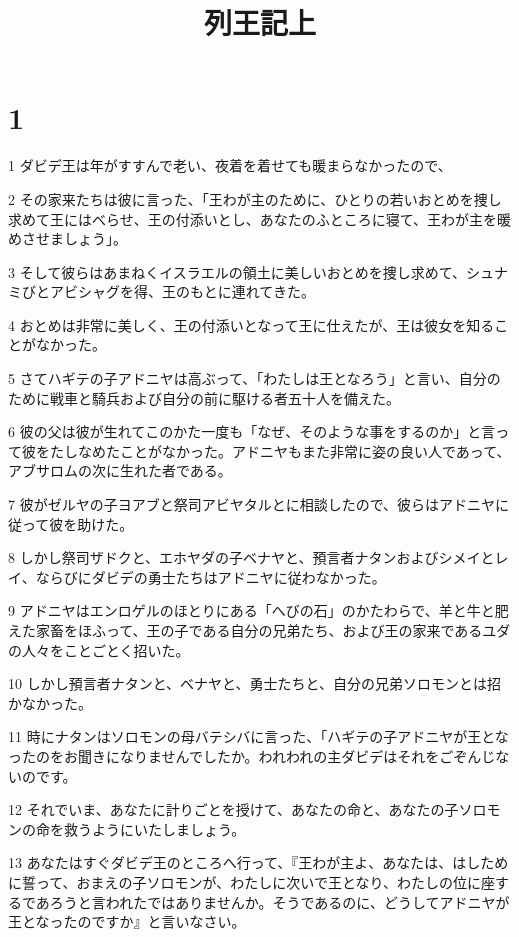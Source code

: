 

\title{列王記上}


\chapter{1}

\par 1 ダビデ王は年がすすんで老い、夜着を着せても暖まらなかったので、
\par 2 その家来たちは彼に言った、「王わが主のために、ひとりの若いおとめを捜し求めて王にはべらせ、王の付添いとし、あなたのふところに寝て、王わが主を暖めさせましょう」。
\par 3 そして彼らはあまねくイスラエルの領土に美しいおとめを捜し求めて、シュナミびとアビシャグを得、王のもとに連れてきた。
\par 4 おとめは非常に美しく、王の付添いとなって王に仕えたが、王は彼女を知ることがなかった。
\par 5 さてハギテの子アドニヤは高ぶって、「わたしは王となろう」と言い、自分のために戦車と騎兵および自分の前に駆ける者五十人を備えた。
\par 6 彼の父は彼が生れてこのかた一度も「なぜ、そのような事をするのか」と言って彼をたしなめたことがなかった。アドニヤもまた非常に姿の良い人であって、アブサロムの次に生れた者である。
\par 7 彼がゼルヤの子ヨアブと祭司アビヤタルとに相談したので、彼らはアドニヤに従って彼を助けた。
\par 8 しかし祭司ザドクと、エホヤダの子ベナヤと、預言者ナタンおよびシメイとレイ、ならびにダビデの勇士たちはアドニヤに従わなかった。
\par 9 アドニヤはエンロゲルのほとりにある「へびの石」のかたわらで、羊と牛と肥えた家畜をほふって、王の子である自分の兄弟たち、および王の家来であるユダの人々をことごとく招いた。
\par 10 しかし預言者ナタンと、ベナヤと、勇士たちと、自分の兄弟ソロモンとは招かなかった。
\par 11 時にナタンはソロモンの母バテシバに言った、「ハギテの子アドニヤが王となったのをお聞きになりませんでしたか。われわれの主ダビデはそれをごぞんじないのです。
\par 12 それでいま、あなたに計りごとを授けて、あなたの命と、あなたの子ソロモンの命を救うようにいたしましょう。
\par 13 あなたはすぐダビデ王のところへ行って、『王わが主よ、あなたは、はしために誓って、おまえの子ソロモンが、わたしに次いで王となり、わたしの位に座するであろうと言われたではありませんか。そうであるのに、どうしてアドニヤが王となったのですか』と言いなさい。
